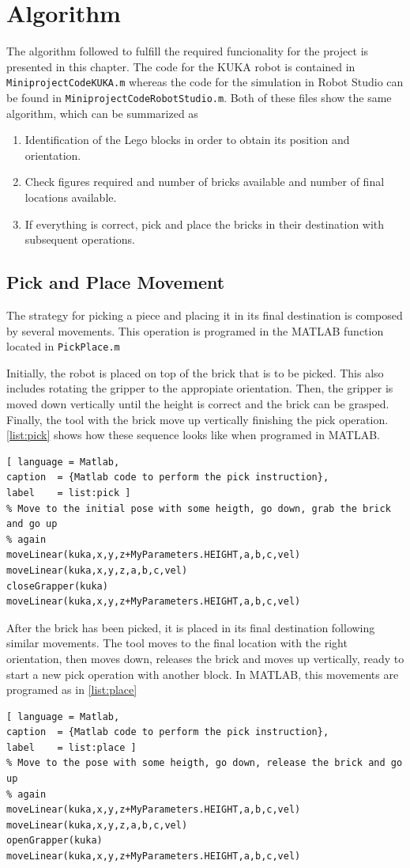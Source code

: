 \chapter{Algorithm}\label{chap:algorithm}
The algorithm followed to fulfill the required funcionality for the project is presented in this chapter. The code for the KUKA robot is contained in \lstinline[style=matlabinline]{MiniprojectCodeKUKA.m} whereas the code for the simulation in Robot Studio can be found in \lstinline[style=matlabinline]{MiniprojectCodeRobotStudio.m}. Both of these files show the same algorithm, which can be summarized as
\begin{enumerate}
	\item Identification of the Lego blocks in order to obtain its position and orientation.
	\item Check figures required and number of bricks available and number of final locations available. 
	\item If everything is correct, pick and place the bricks in their destination with subsequent operations.
\end{enumerate}

\section{Pick and Place Movement}
The strategy for picking a piece and placing it in its final destination is composed by several movements. This operation is programed in the MATLAB function located in \lstinline[style=matlabinline]{PickPlace.m}

Initially, the robot is placed on top of the brick that is to be picked. This also includes rotating the gripper to the appropiate orientation. Then, the gripper is moved down vertically until the height is correct and the brick can be grasped. Finally, the tool with the brick move up vertically finishing the pick operation. \autoref{list:pick} shows how these sequence looks like when programed in MATLAB.
\begin{lstlisting}[ language = Matlab,
caption  = {Matlab code to perform the pick instruction},
label    = list:pick ]
% Move to the initial pose with some heigth, go down, grab the brick and go up
% again
moveLinear(kuka,x,y,z+MyParameters.HEIGHT,a,b,c,vel)
moveLinear(kuka,x,y,z,a,b,c,vel)
closeGrapper(kuka)
moveLinear(kuka,x,y,z+MyParameters.HEIGHT,a,b,c,vel)
\end{lstlisting}

After the brick has been picked, it is placed in its final destination following similar movements. The tool moves to the final location with the right orientation, then moves down, releases the brick and moves up vertically, ready to start a new pick operation with another block. In MATLAB, this movements are programed as in \autoref{list:place}
\begin{lstlisting}[ language = Matlab,
caption  = {Matlab code to perform the pick instruction},
label    = list:place ]
% Move to the pose with some heigth, go down, release the brick and go up
% again
moveLinear(kuka,x,y,z+MyParameters.HEIGHT,a,b,c,vel)
moveLinear(kuka,x,y,z,a,b,c,vel)
openGrapper(kuka)
moveLinear(kuka,x,y,z+MyParameters.HEIGHT,a,b,c,vel)
\end{lstlisting}


